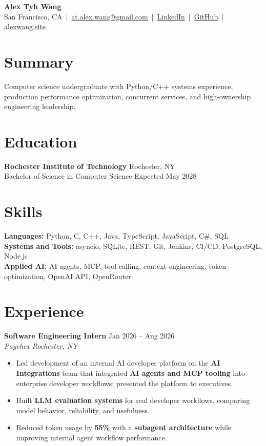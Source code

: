 \documentclass[10pt,letterpaper]{article}
\newif\ifresumeFirstRole
\newcommand{\resumeRole}[4]{%
  \ifresumeFirstRole
    \global\resumeFirstRolefalse
  \else
    \vspace{0pt plus 1fill}%
  \fi
  \textbf{#1} \hfill #2\\
  \textit{#3} \hfill \textit{#4}
}
\begin{document}
\begin{center}
{\Large \textbf{Alex Tyh Wang}}\\
San Francisco, CA \,|\, \href{mailto:at.alex.wang@gmail.com}{at.alex.wang@gmail.com} \,|\, \href{https://www.linkedin.com/in/alex-tyh-wang/}{LinkedIn} \,|\, \href{https://github.com/alextyhwang}{GitHub} \,|\, \href{https://alexwang.site}{alexwang.site}
\end{center}

\section*{Summary}
Computer science undergraduate with Python/C++ systems experience, production performance optimization, concurrent services, and high-ownership engineering leadership.

\section*{Education}
\textbf{Rochester Institute of Technology} \hfill Rochester, NY\\
Bachelor of Science in Computer Science \hfill Expected May 2028

\section*{Skills}
\textbf{Languages:} Python, C, C++, Java, TypeScript, JavaScript, C\#, SQL\\
\textbf{Systems and Tools:} asyncio, SQLite, REST, Git, Jenkins, CI/CD, PostgreSQL, Node.js\\
\textbf{Applied AI:} AI agents, MCP, tool calling, context engineering, token optimization, OpenAI API, OpenRouter

\section*{Experience}
\resumeRole{Software Engineering Intern}{Jan 2026 -- Aug 2026}{Paychex}{Rochester, NY}
\begin{itemize}
  \item Led development of an internal AI developer platform on the \textbf{AI Integrations} team that integrated \textbf{AI agents and MCP tooling} into enterprise developer workflows; presented the platform to executives.
  \item Built \textbf{LLM evaluation systems} for real developer workflows, comparing model behavior, reliability, and usefulness.
  \item Reduced token usage by \textbf{55\%} with a \textbf{subagent architecture} while improving internal agent workflow performance.
\end{itemize}
\end{document}
